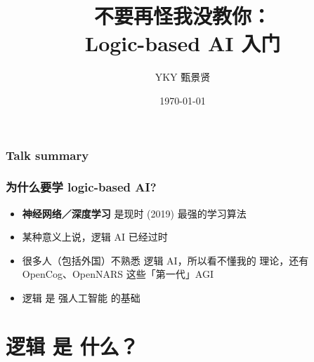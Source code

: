 \documentclass[17pt]{beamer}
\title[Logic AI]{{\normalsize 不要再怪我没教你：}\\ Logic-based AI 入门} %
\author{YKY 甄景贤} %
\institute[] %
{
Independent researcher, Hong Kong \\ %
\medskip
\textit{generic.intelligence@gmail.com} %
}
\date{\today} %
\begin{document}
\frame{\titlepage}

\begin{frame}
\frametitle{Talk summary}
\tableofcontents
\end{frame}

%
%





\begin{frame}
\frametitle{为什么要学 logic-based AI?}
\begin{itemize}
	\item \textbf{神经网络／深度学习} 是现时 (2019) 最强的学习算法
	\item 某种意义上说，逻辑 AI 已经过时
	\item 很多人（包括外国）不熟悉 逻辑 AI，所以看不懂我的 理论，还有 OpenCog、OpenNARS 这些「第一代」AGI
	\item 逻辑 是 强人工智能 的基础
\end{itemize}
\end{frame}

\section[Section]
{\texorpdfstring{逻辑 是 什么？}
	{逻辑 是 什么？}}
\frame{\sectionpage}
\end{document}
